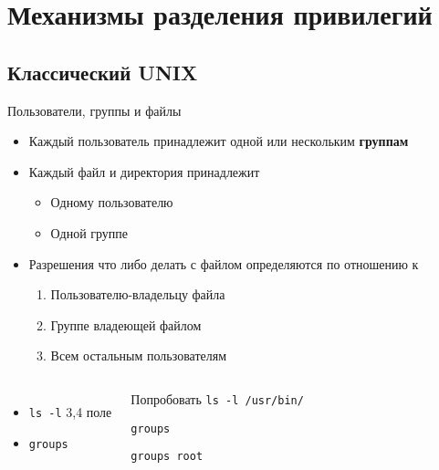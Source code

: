 \section{Механизмы разделения привилегий}
\subsection{Классический UNIX}
\begin{frame}{Пользователи, группы и файлы}
\begin{itemize}
  \item Каждый пользователь принадлежит одной или нескольким \textbf{группам}
  \item Каждый файл и директория принадлежит
    \begin{itemize}
      \item Одному пользователю 
      \item Одной группе
    \end{itemize}
  \pause
  \item  Разрешения что либо делать с файлом определяются по отношению к
    \begin{enumerate}
      \item Пользователю-владельцу файла
      \item Группе владеющей файлом
      \item Всем остальным пользователям
    \end{enumerate}

\end{itemize}
\pause
\begin{columns}
  \begin{itemize}
    \item {\tt ls -l} 3,4 поле 
    \item {\tt groups}
   \end{itemize}
  \begin{block}{Попробовать}
    {\tt ls -l /usr/bin/}

    {\tt groups}

    {\tt groups root}
  \end{block}
\end{columns}
\end{frame}

